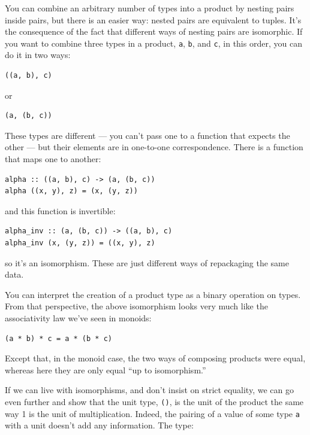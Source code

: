You can combine an arbitrary number of types into a product by nesting
pairs inside pairs, but there is an easier way: nested pairs are
equivalent to tuples. It's the consequence of the fact that different
ways of nesting pairs are isomorphic. If you want to combine three types
in a product, \texttt{a}, \texttt{b}, and \texttt{c}, in this order, you
can do it in two ways:

\begin{verbatim}
((a, b), c)
\end{verbatim}

\noindent
or

\begin{verbatim}
(a, (b, c))
\end{verbatim}

\noindent
These types are different --- you can't pass one to a function that
expects the other --- but their elements are in one-to-one
correspondence. There is a function that maps one to another:

\begin{verbatim}
alpha :: ((a, b), c) -> (a, (b, c))
alpha ((x, y), z) = (x, (y, z))
\end{verbatim}

\noindent
and this function is invertible:

\begin{verbatim}
alpha_inv :: (a, (b, c)) -> ((a, b), c)
alpha_inv (x, (y, z)) = ((x, y), z)
\end{verbatim}

\noindent
so it's an isomorphism. These are just different ways of repackaging the
same data.

You can interpret the creation of a product type as a binary operation
on types. From that perspective, the above isomorphism looks very much
like the associativity law we've seen in monoids:

\begin{verbatim}
(a * b) * c = a * (b * c)
\end{verbatim}

Except that, in the monoid case, the two ways of composing products were
equal, whereas here they are only equal ``up to isomorphism.''

If we can live with isomorphisms, and don't insist on strict equality,
we can go even further and show that the unit type, \texttt{()}, is the
unit of the product the same way 1 is the unit of multiplication.
Indeed, the pairing of a value of some type \texttt{a} with a unit
doesn't add any information. The type:

